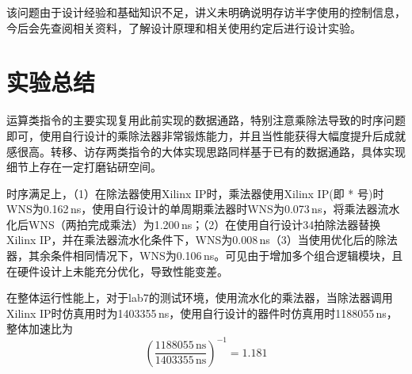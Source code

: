 \documentclass[UTF-8,twoside,c5size]{ctexart}
\begin{document}
	该问题由于设计经验和基础知识不足，讲义未明确说明存访半字使用的控制信息，今后会先查阅相关资料，了解设计原理和相关使用约定后进行设计实验。
	
	\section{实验总结}
	
	运算类指令的主要实现复用此前实现的数据通路，特别注意乘除法导致的时序问题即可，使用自行设计的乘除法器非常锻炼能力，并且当性能获得大幅度提升后成就感很高。转移、访存两类指令的大体实现思路同样基于已有的数据通路，具体实现细节上存在一定打磨钻研空间。
	
	时序满足上，（1）在除法器使用Xilinx IP时，乘法器使用Xilinx IP(即 * 号)时WNS为0.162\,ns，使用自行设计的单周期乘法器时WNS为0.073\,ns，将乘法器流水化后WNS（两拍完成乘法）为1.200\,ns；（2）在使用自行设计34拍除法器替换Xilinx IP，并在乘法器流水化条件下，WNS为0.008\,ns（3）当使用优化后的除法器，其余条件相同情况下，WNS为0.106\,ns。可见由于增加多个组合逻辑模块，且在硬件设计上未能充分优化，导致性能变差。
	
	在整体运行性能上，对于lab7的测试环境，使用流水化的乘法器，当除法器调用Xilinx IP时仿真用时为1403355\,ns，使用自行设计的器件时仿真用时1188055\,ns，整体加速比为
	\[\left(\frac{1188055\,\mathrm{ns}}{1403355\,\mathrm{ns}}\right)^{-1}=1.181\]
	
\end{document}
